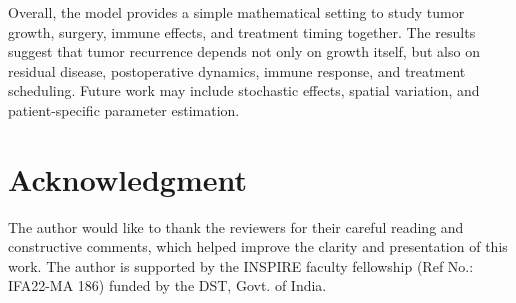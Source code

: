 \documentclass[11pt, reqno]{amsart}
\numberwithin{equation}{section}
\theoremstyle{definition}
\begin{document}
Overall, the model provides a simple mathematical setting to study tumor growth, surgery, immune effects, and treatment timing together. The results suggest that tumor recurrence depends not only on growth itself, but also on residual disease, postoperative dynamics, immune response, and treatment scheduling. Future work may include stochastic effects, spatial variation, and patient-specific parameter estimation.


\section*{Acknowledgment}
The author would like to thank the reviewers for their careful reading and constructive comments, which helped improve the clarity and presentation of this work. The author is supported by the INSPIRE faculty fellowship (Ref No.: IFA22-MA 186) funded by the DST, Govt. of India.
\end{document}
